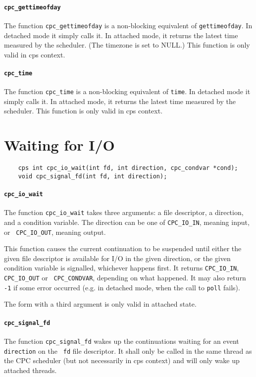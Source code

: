 \documentclass[a4paper]{report}
\begin{document}
\paragraph{\tt cpc\_gettimeofday} The function {\tt cpc\_gettimeofday}
is a non-blocking equivalent of {\tt gettimeofday}.  In detached mode it
simply calls it.  In attached mode, it returns the latest time measured
by the scheduler.  (The timezone is set to NULL.)  This function is only
valid in cps context.

\paragraph{\tt cpc\_time} The function {\tt cpc\_time} is a non-blocking
equivalent of {\tt time}.  In detached mode it simply calls it.  In
attached mode, it returns the latest time measured by the scheduler.
This function is only valid in cps context.

\section{Waiting for I/O}

\begin{verbatim}
    cps int cpc_io_wait(int fd, int direction, cpc_condvar *cond);
    void cpc_signal_fd(int fd, int direction);
\end{verbatim}

\paragraph{\tt cpc\_io\_wait} The function {\tt cpc\_io\_wait} takes three
arguments: a file descriptor, a direction, and a condition variable.
The direction can be one of {\tt CPC\_IO\_IN}, meaning input, or {\tt
  CPC\_IO\_OUT}, meaning output.

This function causes the current continuation to be suspended until
either the given file descriptor is available for I/O in the given
direction, or the given condition variable is signalled, whichever
happens first.  It returns {\tt CPC\_IO\_IN}, {\tt CPC\_IO\_OUT} or {\tt
CPC\_CONDVAR}, depending on what happened.  It may also return {\tt -1}
if some error occurred (e.g. in detached mode, when the call to
{\tt poll} fails).

The form with a third argument is only valid in attached state.

\paragraph{\tt cpc\_signal\_fd} The function {\tt cpc\_signal\_fd} wakes
up the continuations waiting for an event {\tt direction} on the {\tt
fd} file descriptor.  It shall only be called in the same thread as the
CPC scheduler (but not necessarily in cps context) and will only wake up
attached threads.
\end{document}
